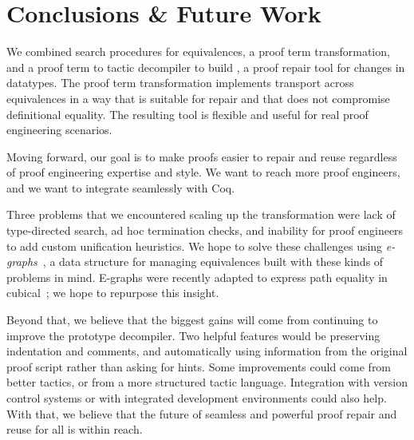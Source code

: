 \section{Conclusions \& Future Work}
\label{sec:discussion}

We combined search procedures for equivalences, a proof term transformation,
and a proof term to tactic decompiler to build \toolname,
a proof repair tool for changes in datatypes.
The proof term transformation implements transport across equivalences in a way that is suitable for repair
and that does not compromise definitional equality.
The resulting tool is flexible and useful for real proof engineering scenarios.



Moving forward, our goal is to make proofs easier to repair and reuse regardless of proof engineering expertise and style.
We want to reach more proof engineers, and we want \toolname to integrate seamlessly with Coq.

Three problems that we encountered scaling up the \toolname transformation were lack of type-directed search,
ad hoc termination checks, and inability for proof engineers to add custom unification heuristics.
We hope to solve these challenges using \textit{e-graphs}~\cite{egraph1},
a data structure %
for managing equivalences
built with these kinds of problems in mind.
E-graphs were recently adapted to express path equality in cubical~\cite{egraph6}; we hope to repurpose this insight.

Beyond that, we believe that the biggest gains will come from continuing to improve the prototype decompiler.
Two helpful features would be preserving indentation and comments, and automatically using information from the original proof script rather than asking for hints.
Some improvements could come from better tactics,
or from a more structured tactic language.
Integration with version control systems or with integrated development environments could also help.
With that, we believe that the future of seamless and powerful proof repair and reuse for all is within reach.


